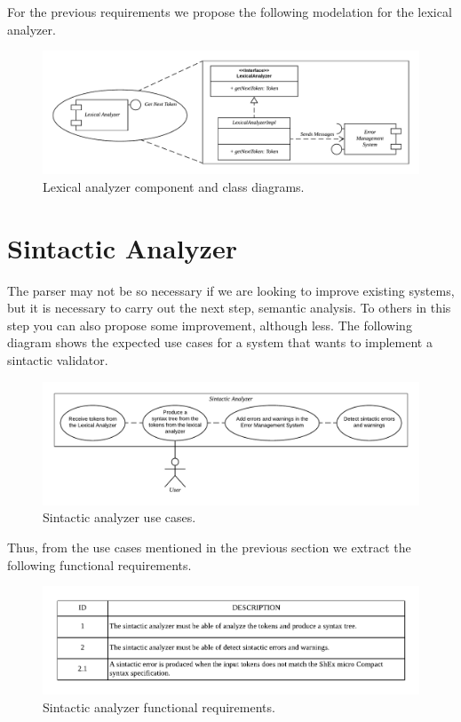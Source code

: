 For the previous requirements we propose the following modelation for the lexical analyzer.

\begin{figure}[h!]
    \includegraphics[width=\textwidth]{images/lex-diagram.pdf}
    \centering
    \caption[Lexical analyzer component and class diagrams]{Lexical analyzer component and class diagrams.}
    \label{fig:lex-diag}
\end{figure}

\section{Sintactic Analyzer}
The parser may not be so necessary if we are looking to improve existing systems, but it is
necessary to carry out the next step, semantic analysis. To others
in this step you can also propose some improvement, although less. The following diagram
shows the expected use cases for a system that wants to implement a sintactic validator.

\begin{figure}[h!]
    \includegraphics[scale=0.6]{images/sin-use-case.pdf}
    \centering
    \caption[Sintactic analyzer use cases]{Sintactic analyzer use cases.}
    \label{fig:sin-use-case}
\end{figure}

Thus, from the use cases mentioned in the previous section we
extract the following functional requirements.

\begin{figure}[h!]
    \includegraphics[width=\textwidth]{images/sin-reqf.pdf}
    \centering
    \caption[Sintactic analyzer functional requirements]{Sintactic analyzer functional requirements.}
    \label{fig:sin-reqf}
\end{figure}

